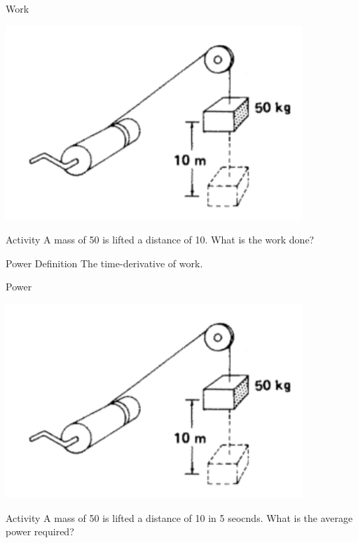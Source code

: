 \documentclass[presentation,aspectratio=169]{beamer}
\begin{document}
\begin{frame}[label={sec:orgcf01b17}]{Work}
\begin{center}
\includegraphics[height=0.6\textheight]{../../figures/pulley-block-50kg.png}
\end{center}

\alert{Activity} A mass of \unit{50}{\kilogram} is lifted a distance of \unit{10}{\meter}. What is the work done?
\end{frame}



\begin{frame}[label={sec:org4e6340d}]{Power}
\alert{Definition} The time-derivative of work.
\end{frame}

\begin{frame}[label={sec:orgb29c678}]{Power}
\begin{center}
\includegraphics[height=0.6\textheight]{../../figures/pulley-block-50kg.png}
\end{center}

\alert{Activity} A mass of \unit{50}{\kilogram} is lifted a distance of \unit{10}{\meter} in 5 seocnds. What is the average power required?
\end{frame}
\end{document}

